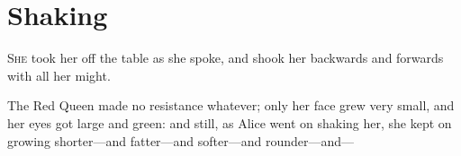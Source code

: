 \chapter{Shaking}
\lettrine[lines=4]{S}{he} took her off the table as she spoke, and shook her backwards and forwards with all her might.

\zz
The Red Queen made no resistance whatever; only her face grew very small, and her eyes got large and green: and still, as Alice went on shaking her, she kept on growing shorter—and fatter—and softer—and rounder—and—

\label{white11}